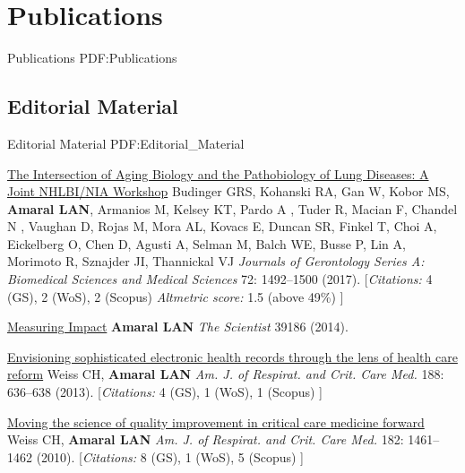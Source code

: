 \section
{Publications}
{Publications}
{PDF:Publications}

\subsection
{Editorial Material}
{Editorial Material}
{PDF:Editorial_Material}

\GapNoBreak
\NumberedItem{\makebox[0.8cm][r]{[12]}}
\href{nan}
{The Intersection of Aging Biology and the Pathobiology of Lung Diseases: A Joint NHLBI/NIA Workshop}
\newline
Budinger GRS,  Kohanski RA, Gan W, Kobor MS,  {\textbf{Amaral LAN}},  Armanios M, Kelsey KT, Pardo A , Tuder R, Macian F, Chandel N , Vaughan D, Rojas M,  Mora AL,  Kovacs E, Duncan SR, Finkel T, Choi A, Eickelberg O, Chen D, Agusti A, Selman M,  Balch WE, Busse P, Lin A, Morimoto R, Sznajder JI, Thannickal VJ
\newline
\textit{Journals of Gerontology Series A: Biomedical Sciences and Medical Sciences}
    72:
1492--1500 (2017).
    \newline
    \hfill [{\em{Citations:}} 4 (GS),
    2 (WoS), 2 (Scopus)
        {\hspace*{1cm} \em{Altmetric score:}}  1.5 (above 49\%)
    ]
\newline
\Gap
~
\Gap

\NumberedItem{\makebox[0.8cm][r]{[11]}}
\href{False}
{Measuring Impact}
\newline
{\textbf{Amaral LAN}}
\newline
\textit{The Scientist}
39186 (2014).
\newline
\Gap
~
\Gap

\NumberedItem{\makebox[0.8cm][r]{[10]}}
\href{/people/amaral/envisioning-sophisticated-electronic-health-records-through-lens-health-care-reform}
{Envisioning sophisticated electronic health records through the lens of health care reform}
\newline
Weiss CH, {\textbf{Amaral LAN}}
\newline
\textit{Am. J. of Respirat. and Crit. Care Med.}
    188:
636--638 (2013).
    \newline
    \hfill [{\em{Citations:}} 4 (GS),
    1 (WoS), 1 (Scopus)
    ]
\newline
\Gap
~
\Gap

\NumberedItem{\makebox[0.8cm][r]{[9]}}
\href{False}
{Moving the science of quality improvement in critical care medicine forward}
\newline
Weiss CH, {\textbf{Amaral LAN}}
\newline
\textit{Am. J. of Respirat. and Crit. Care Med.}
    182:
1461--1462  (2010).
    \newline
    \hfill [{\em{Citations:}} 8 (GS),
    1 (WoS), 5 (Scopus)
    ]
\newline
\Gap
~
\Gap

